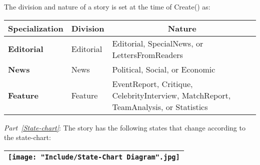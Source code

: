 \documentclass{article}
\begin{document}
The division and nature of a story is set at the time of Create() as:

\begin{center}
\begin{scriptsize}
\begin{tabular}{|l|l|p{7cm}|} \hline
\multicolumn{1}{|c}{\bf Specialization} & \multicolumn{1}{|c}{\bf Division} & \multicolumn{1}{|c|}{\bf Nature} \\ \hline
{\bf Editorial} & Editorial & Editorial, SpecialNews, or LettersFromReaders \\
{\bf News} 		& News		& Political, Social, or Economic \\
{\bf Feature} 	& Feature	& EventReport, Critique, CelebrityInterview, MatchReport, TeamAnalysis, or Statistics\\ \hline
\end{tabular}
\end{scriptsize}
\end{center}

\newpage
{\em Part~\ref{State-chart}}: The story has the following states that change according to the state-chart:

\begin{center}
\begin{tabular}{|l|} \hline
\texttt{[image: "Include/State-Chart Diagram".jpg]} \\ \hline
\end{tabular}
\end{center}
\end{document}
